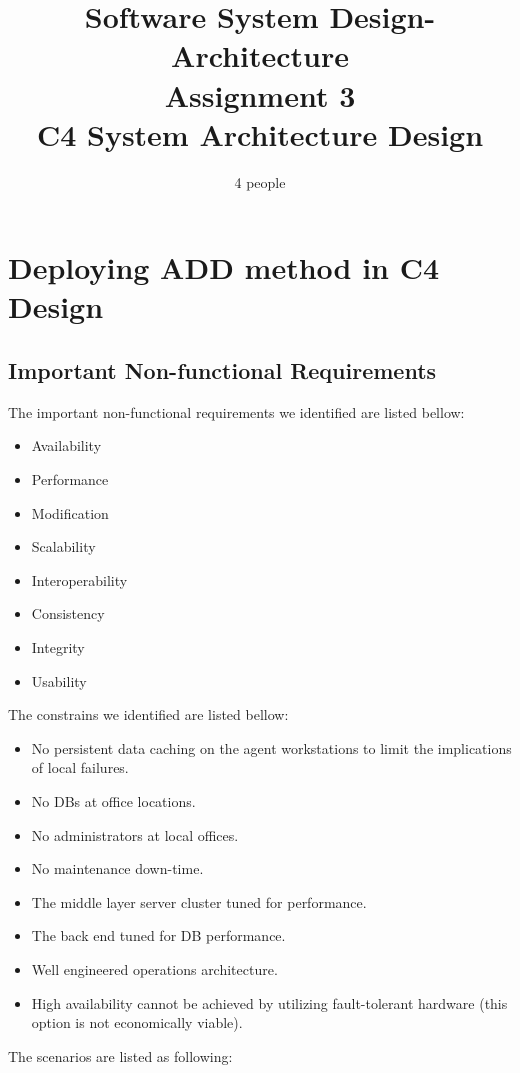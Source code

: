 \documentclass{article}
\title{Software System Design-Architecture\\Assignment 3\\C4 System Architecture Design}
\author{4 people}
\begin{document}
	\maketitle
	\tableofcontents
	\newpage
	\section{Deploying ADD method in C4 Design}
	\subsection{Important Non-functional Requirements}
	The important non-functional requirements we identified are listed bellow:
	\begin{itemize}
		\item {Availability}
		\item {Performance}
		\item {Modification}
		\item {Scalability}
		\item {Interoperability}
		\item {Consistency}
		\item {Integrity}
		\item {Usability}
	\end{itemize}
	The constrains we identified are listed bellow:

	\begin{itemize}
		\item No persistent data caching on the agent workstations to limit the implications of local failures.
		\item No DBs at office locations.
		\item No administrators at local offices.
		\item No maintenance down-time.
		\item The middle layer server cluster tuned for performance.
		\item The back end tuned for DB performance.
		\item Well engineered operations architecture.
		\item High availability cannot be achieved by utilizing fault-tolerant hardware (this option is not
		economically viable).
	\end{itemize}
	The scenarios are listed as following:
\end{document}
